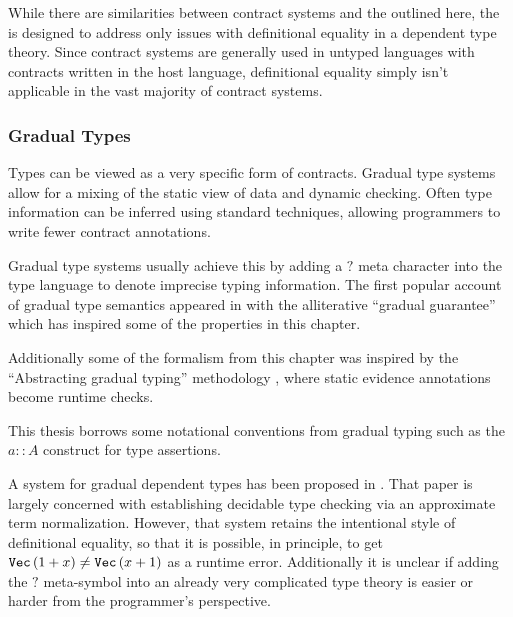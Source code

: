 While there are similarities between contract systems and the \csys{} outlined here, the \csys{} is designed to address only issues with definitional equality in a dependent type theory.
Since contract systems are generally used in untyped languages with contracts written in the host language, definitional equality simply isn't applicable in the vast majority of contract systems.
 
\subsubsection{Gradual Types}
 
Types can be viewed as a very specific form of contracts.
Gradual type systems allow for a mixing of the static view of data and dynamic checking.
Often type information can be inferred using standard techniques, allowing programmers to write fewer contract annotations.
 
Gradual type systems usually achieve this by adding a $?$ meta character into the type language to denote imprecise typing information.
The first popular account of gradual type semantics appeared in \cite{siek_et_al:LIPIcs:2015:5031} with the alliterative ``gradual guarantee'' which has inspired some of the properties in this chapter.
 
 
 
Additionally some of the formalism from this chapter was inspired by the ``Abstracting gradual typing'' methodology \cite{10.1145/2837614.2837670}, where static evidence annotations become runtime checks.
 
This thesis borrows some notational conventions from gradual typing such as the $a::A$ construct for type assertions.
 
A system for gradual dependent types has been proposed in \cite{10.1145/3341692}.
That paper is largely concerned with establishing decidable type checking via an approximate term normalization.
However, that system retains the intentional style of definitional equality, so that it is possible, in principle, to get $\mathtt{Vec}{}\,(1+x)\neq \mathtt{Vec}{}\,(x+1)$ as a runtime error.
Additionally it is unclear if adding the $?$ meta-symbol into an already very complicated type theory is easier or harder from the programmer's perspective.
 
